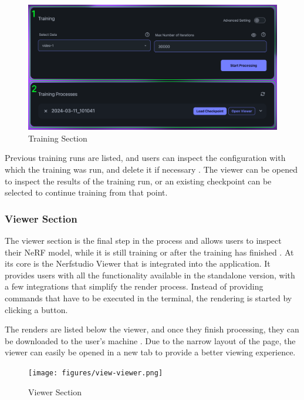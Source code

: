 \begin{figure}[h!]
  \centering
  \includegraphics[width=.7\textwidth]{figures/view-train.png}
  \caption{Training Section}
  \label{fig:design:training-section}
\end{figure}

Previous training runs are listed, and users can inspect the configuration with which the training was run, and delete it if necessary .
The viewer can be opened to inspect the results of the training run, or an existing checkpoint can be selected to continue training from that point.

\subsubsection*{Viewer Section}

The viewer section is the final step in the process and allows users to inspect their NeRF model, while it is still training or after the training has finished .
At its core is the Nerfstudio Viewer that is integrated into the application.
It provides users with all the functionality available in the standalone version, with a few integrations that simplify the render process.
Instead of providing commands that have to be executed in the terminal, the rendering is started by clicking a button.

The renders are listed below the viewer, and once they finish processing, they can be downloaded to the user's machine .
Due to the narrow layout of the page, the viewer can easily be opened in a new tab to provide a better viewing experience.

\begin{figure}[h!]
  \centering
  \texttt{[image: figures/view-viewer.png]}
  \caption{Viewer Section}
  \label{fig:design:viewer-section}
\end{figure}

